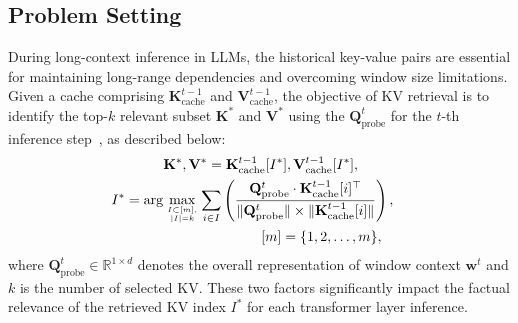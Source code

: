 \subsection{Problem Setting}
\label{sec:problem}
During long-context inference in LLMs, the historical key-value pairs are essential for maintaining long-range dependencies and overcoming window size limitations. Given a cache comprising $\mathbf{K}^{t-1}_{\text{cache}}$ and $\mathbf{V}^{t-1}_{\text{cache}}$, the objective of KV retrieval is to identify the top-$k$ relevant subset $\mathbf{K}^{*}$ and $\mathbf{V}^{*}$ using the \pq $\mathbf{Q}^{t}_{\text{probe}}$ for the $t$-th inference step~\cite{infllm,emllm,tokenselect}, as described below:
\begin{equation}
\begin{aligned}
&\mathbf{K}^{*},\mathbf{V}^{*} =\mathbf{K}^{t-1}_{\text{cache}}[I^*],\mathbf{V}^{t-1}_{\text{cache}}[I^*], \\
I^* = \arg&\max_{I \subset [m],\atop |I| = k} \sum_{i \in I} \left( \frac{\mathbf{Q}^{t}_{\text{probe}} \cdot {\mathbf{K}^{t-1}_{\text{cache}}}[i]^\top}{\|\mathbf{Q}^{t}_{\text{probe}}\| \times \| \mathbf{K}^{t-1}_{\text{cache}}[i] \|} \right),\\ 
&\quad\quad\quad\quad\quad\quad\quad[m] = \{1,2,\ldots, m\},&
\end{aligned}
\end{equation}
where $\mathbf{Q}^{t}_{\text{probe}} \in \mathbb{R}^{1 \times d}$ denotes the overall representation of window context $\mathbf{w}^{t}$ and $k$ is the number of selected KV. These two factors significantly impact the factual relevance of the retrieved KV index $I^*$ for each transformer layer inference.